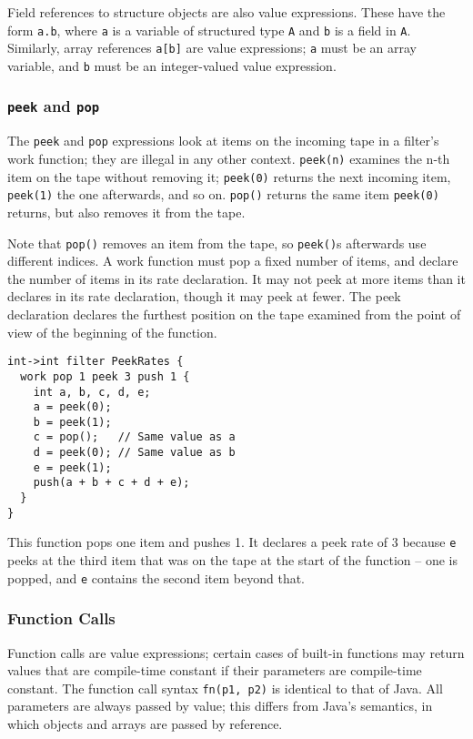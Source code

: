 \documentclass[11pt]{article}
\begin{document}
Field references to structure objects are also value expressions.
These have the form \texttt{a.b}, where \texttt{a} is a variable of
structured type \texttt{A} and \texttt{b} is a field in \texttt{A}.
Similarly, array references \texttt{a[b]} are value expressions;
\texttt{a} must be an array variable, and \texttt{b} must be an
integer-valued value expression.

\subsubsection{\texttt{peek} and \texttt{pop}}
\label{sec:expr-peek-pop}

The \texttt{peek} and \texttt{pop} expressions look at items on
the incoming tape in a filter's work function; they are illegal in any
other context.  \texttt{peek(n)} examines the n-th item on the tape
without removing it; \texttt{peek(0)} returns the next incoming
item, \texttt{peek(1)} the one afterwards, and so on.
\texttt{pop()} returns the same item \texttt{peek(0)} returns,
but also removes it from the tape.

Note that \texttt{pop()} removes an item from the tape, so
\texttt{peek()}s afterwards use different indices.  A work function
must pop a fixed number of items, and declare the number of items in
its rate declaration.  It may not peek at more items than it declares
in its rate declaration, though it may peek at fewer.  The peek
declaration declares the furthest position on the tape examined from
the point of view of the beginning of the function.

\begin{verbatim}
int->int filter PeekRates {
  work pop 1 peek 3 push 1 {
    int a, b, c, d, e;
    a = peek(0);
    b = peek(1);
    c = pop();   // Same value as a
    d = peek(0); // Same value as b
    e = peek(1);
    push(a + b + c + d + e);
  }
}
\end{verbatim}

This function pops one item and pushes 1.  It declares a peek rate of
3 because \texttt{e} peeks at the third item that was on the tape
at the start of the function -- one is popped, and \texttt{e}
contains the second item beyond that.

\subsubsection{Function Calls}
\label{sec:expr-funcall}

Function calls are value expressions; certain cases of built-in
functions may return values that are compile-time constant if their
parameters are compile-time constant.  The function call syntax
\texttt{fn(p1, p2)} is identical to that of Java.  All parameters are
always passed by value; this differs from Java's semantics, in which
objects and arrays are passed by reference.
\end{document}
